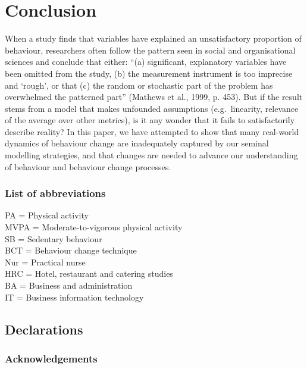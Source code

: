 \documentclass[
  british,
  man,floatsintext]{apa6}
\begin{document}
\hypertarget{conclusion}{%
\section{Conclusion}\label{conclusion}}

When a study finds that variables have explained an unsatisfactory proportion of behaviour, researchers often follow the pattern seen in social and organisational sciences and conclude that either: \enquote{(a) significant, explanatory variables have been omitted from the study, (b) the measurement instrument is too imprecise and \enquote{rough}, or that (c) the random or stochastic part of the problem has overwhelmed the patterned part} (Mathews et al., 1999, p. 453). But if the result stems from a model that makes unfounded assumptions (e.g.~linearity, relevance of the average over other metrics), is it any wonder that it fails to satisfactorily describe reality? In this paper, we have attempted to show that many real-world dynamics of behaviour change are inadequately captured by our seminal modelling strategies, and that changes are needed to advance our understanding of behaviour and behaviour change processes.

\hypertarget{list-of-abbreviations}{%
\subsubsection{List of abbreviations}\label{list-of-abbreviations}}

\noindent 
PA = Physical activity\\
MVPA = Moderate-to-vigorous physical activity\\
SB = Sedentary behaviour\\
BCT = Behaviour change technique\\
Nur = Practical nurse\\
HRC = Hotel, restaurant and catering studies\\
BA = Business and administration\\
IT = Business information technology

\hypertarget{declarations}{%
\subsection{Declarations}\label{declarations}}

\hypertarget{acknowledgements}{%
\subsubsection{Acknowledgements}\label{acknowledgements}}
\end{document}
